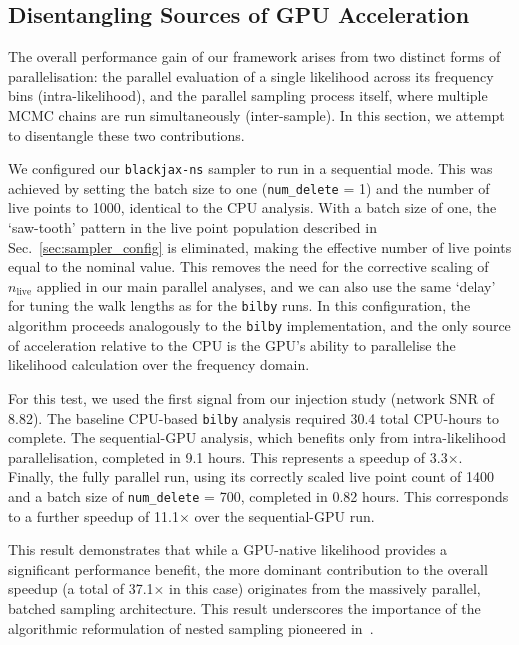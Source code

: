 \documentclass[fleqn,usenatbib]{mnras}
\begin{document}
\subsection{Disentangling Sources of GPU Acceleration}
\label{sec:disentangling_acceleration}

The overall performance gain of our framework arises from two distinct
forms of parallelisation: the parallel evaluation of a single
likelihood across its frequency bins (intra-likelihood), and the
parallel sampling process itself, where multiple MCMC chains are run
simultaneously (inter-sample). In this section, we attempt to disentangle
these two contributions.

We configured our \texttt{blackjax-ns} sampler to run in a sequential
mode. This was achieved by setting the batch size to one
(\texttt{num\_delete} = 1) and the number of live points to 1000,
identical to the CPU analysis. With a batch size of one, the
`saw-tooth' pattern in the live point population described in
Sec.~\ref{sec:sampler_config} is eliminated, making the effective
number of live points equal to the nominal value. This removes the need
for the corrective scaling of $n_{\text{live}}$ applied in our main
parallel analyses, and we can also use the same `delay' for tuning the walk lengths
as for the \texttt{bilby} runs. In this configuration, the algorithm proceeds
analogously to the \texttt{bilby} implementation, and the only source of
acceleration relative to the CPU is the GPU's ability to parallelise the
likelihood calculation over the frequency domain.

For this test, we used the first signal from our injection study (network
SNR of 8.82). The baseline CPU-based \texttt{bilby} analysis required
30.4 total CPU-hours to complete. The sequential-GPU analysis, which
benefits only from intra-likelihood parallelisation, completed in
9.1 hours. This represents a speedup of 3.3$\times$. Finally, the
fully parallel run, using its correctly scaled live point count of 1400 and
a batch size of \texttt{num\_delete} = 700, completed in 0.82 hours.
This corresponds to a further speedup of 11.1$\times$ over the
sequential-GPU run.

This result demonstrates that while a GPU-native likelihood provides
a significant performance benefit, the more dominant contribution to the
overall speedup (a total of 37.1$\times$ in this case) originates from the
massively parallel, batched sampling architecture. This result
underscores the importance of the algorithmic reformulation 
of nested sampling pioneered in~\cite{yallup2025nested}.
\end{document}
